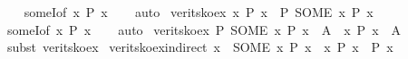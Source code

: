\begin{isabellebody}
%
\isadelimproof
\ \ %
\endisadelimproof
%
\isatagproof
{}\isamarkupfalse%
\ someI{\isacharbrackleft}{\kern0pt}of\ {\isacartoucheopen}{\isasymlambda}x{\isachardot}{\kern0pt}\ {\isasymnot}P\ x{\isacartoucheclose}{\isacharbrackright}{\kern0pt}\isanewline
\ \ \isamarkupfalse%
\ auto%
\endisatagproof
{\isafoldproof}%
%
\isadelimproof
\isanewline
%
\endisadelimproof
\isanewline
{}\isamarkupfalse%
\ verit{\isacharunderscore}{\kern0pt}sko{\isacharunderscore}{\kern0pt}ex{\isacharcolon}{\kern0pt}\ {\isacartoucheopen}{\isacharparenleft}{\kern0pt}{\isasymexists}x{\isachardot}{\kern0pt}\ P\ x{\isacharparenright}{\kern0pt}\ {\isasymlongleftrightarrow}\ P\ {\isacharparenleft}{\kern0pt}SOME\ x{\isachardot}{\kern0pt}\ P\ x{\isacharparenright}{\kern0pt}{\isacartoucheclose}\isanewline
%
\isadelimproof
\ \ %
\endisadelimproof
%
\isatagproof
{}\isamarkupfalse%
\ someI{\isacharbrackleft}{\kern0pt}of\ {\isacartoucheopen}{\isasymlambda}x{\isachardot}{\kern0pt}\ P\ x{\isacartoucheclose}{\isacharbrackright}{\kern0pt}\isanewline
\ \ \isamarkupfalse%
\ auto%
\endisatagproof
{\isafoldproof}%
%
\isadelimproof
\isanewline
%
\endisadelimproof
\isanewline
{}\isamarkupfalse%
\ verit{\isacharunderscore}{\kern0pt}sko{\isacharunderscore}{\kern0pt}ex{\isacharprime}{\kern0pt}{\isacharcolon}{\kern0pt}\ {\isacartoucheopen}P\ {\isacharparenleft}{\kern0pt}SOME\ x{\isachardot}{\kern0pt}\ P\ x{\isacharparenright}{\kern0pt}\ {\isacharequal}{\kern0pt}\ A\ {\isasymLongrightarrow}\ {\isacharparenleft}{\kern0pt}{\isasymexists}x{\isachardot}{\kern0pt}\ P\ x{\isacharparenright}{\kern0pt}\ {\isacharequal}{\kern0pt}\ A{\isacartoucheclose}\isanewline
%
\isadelimproof
\ \ %
\endisadelimproof
%
\isatagproof
{}\isamarkupfalse%
\ {\isacharparenleft}{\kern0pt}subst\ verit{\isacharunderscore}{\kern0pt}sko{\isacharunderscore}{\kern0pt}ex{\isacharparenright}{\kern0pt}%
\endisatagproof
{\isafoldproof}%
%
\isadelimproof
\isanewline
%
\endisadelimproof
\isanewline
{}\isamarkupfalse%
\ verit{\isacharunderscore}{\kern0pt}sko{\isacharunderscore}{\kern0pt}ex{\isacharunderscore}{\kern0pt}indirect{\isacharcolon}{\kern0pt}\ {\isacartoucheopen}x\ {\isacharequal}{\kern0pt}\ {\isacharparenleft}{\kern0pt}SOME\ x{\isachardot}{\kern0pt}\ P\ x{\isacharparenright}{\kern0pt}\ {\isasymLongrightarrow}\ {\isacharparenleft}{\kern0pt}{\isasymexists}x{\isachardot}{\kern0pt}\ P\ x{\isacharparenright}{\kern0pt}\ {\isasymlongleftrightarrow}\ P\ x{\isacartoucheclose}\isanewline
%
\isadelimproof
\ \ %
\endisadelimproof
%
\isatagproof

\end{isabellebody}
